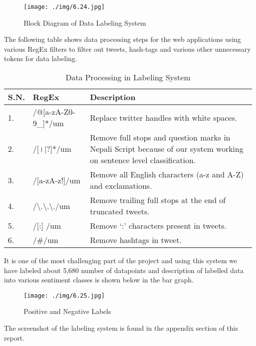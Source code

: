         \begin{figure}[hbt!]
            \centering
                \texttt{[image: ./img/6.24.jpg]}
                \caption{Block Diagram of Data Labeling System}
        \end{figure}
The following table shows data processing steps for the web applications using various
RegEx filters to filter out tweets, hash-tags and various other unnecessary tokens for
data labeling.

        \begin{table}[h]
            \centering
            \caption{Data Processing in Labeling System}
           \begin{tabular}{|p{3cm}|p{4cm}|p{5cm}|}
                \hline
                \textbf{S.N.} & \textbf{RegEx} & \textbf{Description} \\
                \hline
                1. & /@[a-zA-Z0-9_]*/um & Replace twitter handles with white spaces. \\
                \hline
                2. & /[।|?]*/um & Remove full stops and question marks in Nepali Script because of our system working on sentence level classification. \\
                \hline
                 3. & /[a-zA-z!]/um & Remove all English characters (a-z and A-Z) and exclamations. \\
                \hline
                 4. & /\textbackslash.\textbackslash.\textbackslash./um & Remove trailing full stops at the end of truncated tweets. \\
                \hline
                5. & /[:] /um & Remove ‘:’ characters present in tweets. \\
                \hline
                 6. & /#/um & Remove hashtags in tweet. \\
                \hline
            \end{tabular}
        \end{table}
It is one of the most challenging part of the project and using this system we have
labeled about 5,680 number of datapoints and description of labelled data into various
sentiment classes is shown below in the bar graph.
        \begin{figure}[hbt!]
            \centering
                \texttt{[image: ./img/6.25.jpg]}
                \caption{Positive and Negative Labels}
        \end{figure}

The screenshot of the labeling system is found in the appendix section of this report.

